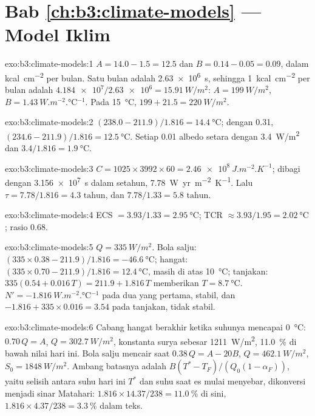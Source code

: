 \section*{Bab \ref{ch:b3:climate-models} --- Model Iklim}

\begin{solution}{exo:b3:climate-models:1}
$A = 14.0 - 1.5 = \num{12.5}$ dan $B = 0.14 - 0.05 = \num{0.09}$, dalam
\unit{kcal.cm^{-2}} per bulan. Satu bulan adalah \qty{2.63e6}{s}, sehingga
\qty{1}{kcal.cm^{-2}} per bulan adalah $\num{4.184e7}/\num{2.63e6} =
\qty{15.91}{W/m^2}$: $A = \qty{199}{W/m^2}$, $B =
\qty{1.43}{W.m^{-2}.\celsius^{-1}}$. Pada \qty{15}{\celsius}, $199 + 21.5 =
\qty{220}{W/m^2}$.
\end{solution}

\begin{solution}{exo:b3:climate-models:2}
$(238.0 - 211.9)/1.816 = \qty{14.4}{\celsius}$; dengan 0.31, $(234.6 -
211.9)/1.816 = \qty{12.5}{\celsius}$. Setiap 0.01 albedo setara dengan
\qty{3.4}{W/m^2} dan $3.4/1.816 = \qty{1.9}{\celsius}$.
\end{solution}

\begin{solution}{exo:b3:climate-models:3}
$C = 1025\times3992\times60 = \qty{2.46e8}{J.m^{-2}.K^{-1}}$; dibagi
dengan \qty{3.156e7}{s} dalam setahun, \qty{7.78}{W.yr.m^{-2}.K^{-1}}. Lalu $\tau
= 7.78/1.816 = \num{4.3}\text{ tahun}$, dan $7.78/1.33 = \num{5.8}\text{ tahun}$.
\end{solution}

\begin{solution}{exo:b3:climate-models:4}
ECS $= 3.93/1.33 = \qty{2.95}{\celsius}$; TCR $\approx 3.93/1.95 =
\qty{2.02}{\celsius}$; rasio \num{0.68}.
\end{solution}

\begin{solution}{exo:b3:climate-models:5}
$Q = \qty{335}{W/m^2}$. Bola salju: $(335\times0.38 - 211.9)/1.816 =
\qty{-46.6}{\celsius}$; hangat: $(335\times0.70 - 211.9)/1.816 =
\qty{12.4}{\celsius}$, masih di atas \qty{10}{\celsius}; tanjakan: $335(0.54 +
0.016\,T) = 211.9 + 1.816\,T$ memberikan $T = \qty{8.7}{\celsius}$. $N' =
\qty{-1.816}{W.m^{-2}.\celsius^{-1}}$ pada dua yang pertama, stabil, dan $-1.816
+ 335\times0.016 = \num{+3.54}$ pada tanjakan, tidak stabil.
\end{solution}

\begin{solution}{exo:b3:climate-models:6}
Cabang hangat berakhir ketika suhunya mencapai \qty{0}{\celsius}:
$0.70\,Q = A$, $Q = \qty{302.7}{W/m^2}$, konstanta surya sebesar
\qty{1211}{W/m^2}, \qty{11.0}{\percent} di bawah nilai hari ini. Bola salju mencair
saat $0.38\,Q = A - 20B$, $Q = \qty{462.1}{W/m^2}$, $S_0 =
\qty{1848}{W/m^2}$. Ambang batasnya adalah $B(T^* - T_F)/(Q_0(1 - \alpha_F))$,
yaitu selisih antara suhu hari ini $T^*$ dan suhu saat es
mulai menyebar, dikonversi menjadi sinar Matahari: $1.816\times14.37/238 =
\qty{11.0}{\percent}$ di sini, $1.816\times4.37/238 = \qty{3.3}{\percent}$ dalam
teks.
\end{solution}

